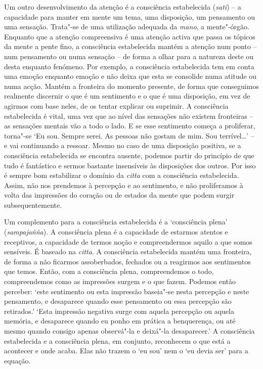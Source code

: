 Um outro desenvolvimento da atenção é a consciência estabelecida (\emph{sati})
-- a capacidade para manter em mente um tema, uma disposição, um pensamento ou
uma sensação. Trata"-se de uma utilização adequada da \emph{mano}, a mente"-órgão.
Enquanto que a atenção compreensiva é uma atenção activa que passa os tópicos da
mente a pente fino, a consciência estabelecida mantém a atenção num ponto -- num
pensamento ou numa sensação -- de forma a olhar para a natureza deste ou desta
enquanto fenómeno. Por exemplo, a consciência estabelecida tem em conta uma
emoção enquanto emoção e não deixa que esta se consolide numa atitude ou numa
acção. Mantém a fronteira do momento presente, de forma que conseguimos
realmente discernir o que é um sentimento e o que é uma disposição, em vez de
agirmos com base neles, de os tentar explicar ou suprimir. A consciência
estabelecida é vital, uma vez que ao nível das sensações não existem fronteiras
-- as sensações mentais vão a todo o lado. E se esse sentimento começa a
proliferar, torna"-se `Eu sou. Sempre serei. As pessoas não gostam de mim. Sou
terrível\ldots' -- e vai continuando a ressoar. Mesmo no caso de uma disposição
positiva, se a consciência estabelecida se encontra ausente, podemos partir do
princípio de que tudo é fantástico e sermos bastante insensíveis às disposições
dos outros. Por isso é sempre bom estabilizar o domínio da \emph{citta} com a
consciência estabelecida. Assim, não nos prendemos à percepção e ao sentimento,
e não proliferamos à volta das impressões do coração ou de estados da mente que
podem surgir subsequentemente.

Um complemento para a consciência estabelecida é a `consciência plena'
(\emph{sampajañña}). A consciência plena é a capacidade de estarmos atentos e
receptivos, a capacidade de termos noção e compreendermos aquilo a que somos
sensíveis. É baseado na \emph{citta}. A consciência estabelecida mantém uma
fronteira, de forma a não ficarmos assoberbados, fechados ou a reagirmos aos
sentimentos que temos. Então, com a consciência plena, compreendemos o todo,
compreendemos como as impressões surgem e o que fazem. Podemos então perceber:
`este sentimento ou esta impressão baseia"-se nesta percepção e neste pensamento,
e desaparece quando esse pensamento ou essa percepção são retirados.' `Esta
impressão negativa surge com aquela percepção ou aquela memória, e desaparece
quando eu ponho em prática a benquerença, ou até mesmo quando consigo apenas
observá"-la e deixá"-la desaparecer.' A consciência estabelecida e a consciência
plena, em conjunto, reconhecem o que está a acontecer e onde acaba. Elas não
trazem o `eu sou' nem o `eu devia ser' para a equação.

